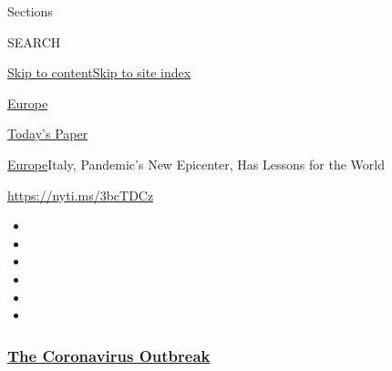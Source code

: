 Sections

SEARCH

\protect\hyperlink{site-content}{Skip to
content}\protect\hyperlink{site-index}{Skip to site index}

\href{https://www.nytimes3xbfgragh.onion/section/world/europe}{Europe}

\href{https://myaccount.nytimes3xbfgragh.onion/auth/login?response_type=cookie\&client_id=vi}{}

\href{https://www.nytimes3xbfgragh.onion/section/todayspaper}{Today's
Paper}

\href{/section/world/europe}{Europe}\textbar{}Italy, Pandemic's New
Epicenter, Has Lessons for the World

\url{https://nyti.ms/3bcTDCz}

\begin{itemize}
\item
\item
\item
\item
\item
\item
\end{itemize}

\hypertarget{the-coronavirus-outbreak}{%
\subsubsection{\texorpdfstring{\href{https://www.nytimes3xbfgragh.onion/news-event/coronavirus?name=styln-coronavirus-national\&region=TOP_BANNER\&variant=undefined\&block=storyline_menu_recirc\&action=click\&pgtype=Article\&impression_id=8dcdbcb0-e39e-11ea-9c7b-936aea0939b9}{The
Coronavirus
Outbreak}}{The Coronavirus Outbreak}}\label{the-coronavirus-outbreak}}

